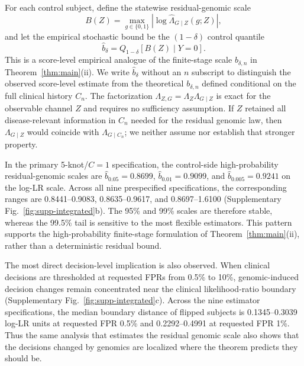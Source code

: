 For each control subject, define the statewise residual-genomic scale
\begin{equation}
B(Z)=\max_{g\in\{0,1\}}\left|\log \widehat{\Lambda}_{G\mid Z}(g;Z)\right|,
\end{equation}
and let the empirical stochastic bound be the $(1-\delta)$ control quantile
\begin{equation}
\widehat b_\delta=Q_{1-\delta}[B(Z)\mid Y=0].
\end{equation}
This is a score-level empirical analogue of the finite-stage scale $b_{\delta,n}$ in Theorem~\ref{thm:main}(ii). We write $\widehat b_\delta$ without an $n$ subscript to distinguish the observed score-level estimate from the theoretical $b_{\delta,n}$ defined conditional on the full clinical history $C_n$. The factorization $\Lambda_{Z,G}=\Lambda_Z\Lambda_{G\mid Z}$ is exact for the observable channel $Z$ and requires no sufficiency assumption. If $Z$ retained all disease-relevant information in $C_n$ needed for the residual genomic law, then $\Lambda_{G\mid Z}$ would coincide with $\Lambda_{G\mid C_n}$; we neither assume nor establish that stronger property.

In the primary 5-knot/$C{=}1$ specification, the control-side high-probability residual-genomic scales are $\widehat b_{0.05}=0.8699$, $\widehat b_{0.01}=0.9099$, and $\widehat b_{0.005}=0.9241$ on the log-LR scale. Across all nine prespecified specifications, the corresponding ranges are 0.8441--0.9083, 0.8635--0.9617, and 0.8697--1.6100 (Supplementary Fig.~\ref{fig:supp-integrated}b). The 95\% and 99\% scales are therefore stable, whereas the 99.5\% tail is sensitive to the most flexible estimators. This pattern supports the high-probability finite-stage formulation of Theorem~\ref{thm:main}(ii), rather than a deterministic residual bound.

The most direct decision-level implication is also observed. When clinical decisions are thresholded at requested FPRs from 0.5\% to 10\%, genomic-induced decision changes remain concentrated near the clinical likelihood-ratio boundary (Supplementary Fig.~\ref{fig:supp-integrated}c). Across the nine estimator specifications, the median boundary distance of flipped subjects is 0.1345--0.3039 log-LR units at requested FPR 0.5\% and 0.2292--0.4991 at requested FPR 1\%. Thus the same analysis that estimates the residual genomic scale also shows that the decisions changed by genomics are localized where the theorem predicts they should be.

